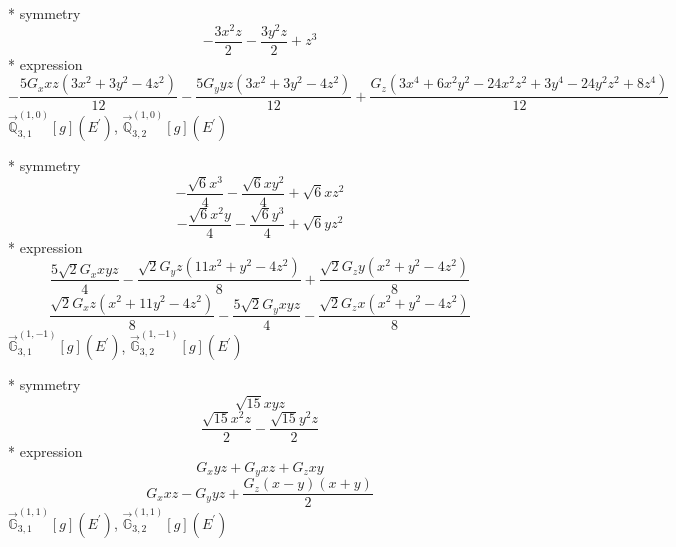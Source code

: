 \documentclass[fleqn,8pt]{jsarticle}
\begin{document}
\noindent\quad ** symmetry
\begin{dmath*}
- \frac{3 x^{2} z}{2} - \frac{3 y^{2} z}{2} + z^{3}
\end{dmath*}
\noindent\quad ** expression
\begin{dmath*}
- \frac{5 G_{x} x z \left(3 x^{2} + 3 y^{2} - 4 z^{2}\right)}{12} - \frac{5 G_{y} y z \left(3 x^{2} + 3 y^{2} - 4 z^{2}\right)}{12} + \frac{G_{z} \left(3 x^{4} + 6 x^{2} y^{2} - 24 x^{2} z^{2} + 3 y^{4} - 24 y^{2} z^{2} + 8 z^{4}\right)}{12}
\end{dmath*}
\noindent\quad $\vec{\mathbb{Q}}_{3,1}^{(1,0)}[g](E^{\prime})$, $\vec{\mathbb{Q}}_{3,2}^{(1,0)}[g](E^{\prime})$

\noindent\quad ** symmetry
\begin{dmath*}
- \frac{\sqrt{6} x^{3}}{4} - \frac{\sqrt{6} x y^{2}}{4} + \sqrt{6} x z^{2}
\end{dmath*}
\begin{dmath*}
- \frac{\sqrt{6} x^{2} y}{4} - \frac{\sqrt{6} y^{3}}{4} + \sqrt{6} y z^{2}
\end{dmath*}
\noindent\quad ** expression
\begin{dmath*}
\frac{5 \sqrt{2} G_{x} x y z}{4} - \frac{\sqrt{2} G_{y} z \left(11 x^{2} + y^{2} - 4 z^{2}\right)}{8} + \frac{\sqrt{2} G_{z} y \left(x^{2} + y^{2} - 4 z^{2}\right)}{8}
\end{dmath*}
\begin{dmath*}
\frac{\sqrt{2} G_{x} z \left(x^{2} + 11 y^{2} - 4 z^{2}\right)}{8} - \frac{5 \sqrt{2} G_{y} x y z}{4} - \frac{\sqrt{2} G_{z} x \left(x^{2} + y^{2} - 4 z^{2}\right)}{8}
\end{dmath*}
\noindent\quad $\vec{\mathbb{G}}_{3,1}^{(1,-1)}[g](E^{\prime})$, $\vec{\mathbb{G}}_{3,2}^{(1,-1)}[g](E^{\prime})$

\noindent\quad ** symmetry
\begin{dmath*}
\sqrt{15} x y z
\end{dmath*}
\begin{dmath*}
\frac{\sqrt{15} x^{2} z}{2} - \frac{\sqrt{15} y^{2} z}{2}
\end{dmath*}
\noindent\quad ** expression
\begin{dmath*}
G_{x} y z + G_{y} x z + G_{z} x y
\end{dmath*}
\begin{dmath*}
G_{x} x z - G_{y} y z + \frac{G_{z} \left(x - y\right) \left(x + y\right)}{2}
\end{dmath*}
\noindent\quad $\vec{\mathbb{G}}_{3,1}^{(1,1)}[g](E^{\prime})$, $\vec{\mathbb{G}}_{3,2}^{(1,1)}[g](E^{\prime})$
\end{document}
